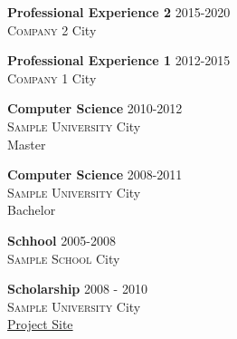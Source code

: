 \begin{body}
    \begin{experience}%
        \begin{cvItem}
            \textbf{Professional Experience 2} \hfill 2015-2020\\
            \textsc{Company 2} City\\
            \lipsum[1]
        \end{cvItem}
        \begin{cvItem}
            \textbf{Professional Experience 1} \hfill 2012-2015\\
            \textsc{Company 1} City\\
            \lipsum[1]
        \end{cvItem}
    \end{experience}

    \begin{education}%
        \begin{cvItem}
            \textbf{Computer Science} \hfill 2010-2012\\
            \textsc{Sample University} City\\
            Master
        \end{cvItem}

        \begin{cvItem}
            \textbf{Computer Science} \hfill 2008-2011\\
            \textsc{Sample University} City\\
            Bachelor
        \end{cvItem}

        \begin{cvItem}
            \textbf{Schhool} \hfill 2005-2008\\
            \textsc{Sample School} City\\
        \end{cvItem}

    \end{education}

    \begin{scholarship}%
        \begin{cvItem}
            \textbf{Scholarship} \hfill 2008 - 2010\\
            \textsc{Sample University} City\\
            \href{https://www.google.de}{Project Site}
            \end{cvItem}
    \end{scholarship}


\end{body}
